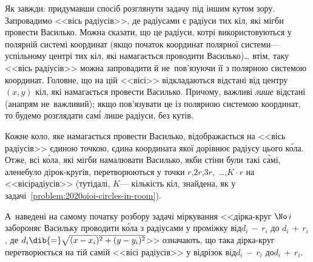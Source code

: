 Як завжди: придумавши спосіб розглянути задачу під іншим кутом зору.
Запровадимо <<вісь радіусів>>, де радіусами є радіуси тих кіл, які міг\nolinebreak[3] би провести Василько. Можна сказати, що це радіуси, котрі використовуються у полярній системі координат (якщо початок координат полярної системи\nolinebreak[3] --- у\nolinebreak[3] спільному центрі тих кіл, які намагається проводити Василько)\dots{} втім, таку <<вісь радіусів>> можна запровадити й не~пов'язуючи її з полярною системою координат. Головне, що на цій <<вісі>> відкладаються відстані від центру\nolinebreak[2] $(x,y)$ кіл, які намагається провести Василько. Причому, важливі \emph{лише} відстані (а\nolinebreak[3] напрям не~важливий); якщо пов'язу\-вати це із полярною системою координат, то будемо розглядати сам\'{і} лише радіуси, без кутів.

Кожне коло, яке намагається провести Василько, відображається на <<вісь радіусів>> єдиною точкою, єдина координата якої дорівнює радіусу %
цього к\'{о}ла. Отже, всі к\'{о}ла, які міг\nolinebreak[3] би намалювати Василько, якби стіни були такі с\'{а}мі, але\nolinebreak[3] не\nolinebreak[3] було дірок-кругів, перетворюються у точки $r$,\nolinebreak[2] $2r$,\nolinebreak[2] $3r$,~\dots{},\nolinebreak[3] $K\cdot r$ на <<вісі\nolinebreak[2] радіусів>> (тут\nolinebreak[2] і\nolinebreak[2] далі, $K$\nolinebreak[3] --- кількість кіл, знайдена, як у задачі~\ref{problem:2020oioi-circles-in-room}).

А~наведені на самому початку розбору задачі міркування <<дірка-круг $\No\,i$ забороняє Васильку проводити к\'{о}ла з радіусами у проміжку від\nolinebreak[2] ${d_i\,{-}\,r_i}$ до ${d_i\,{+}\,r_i}$, де $d_i\dib{{=}}\sqrt{(x-x_i)^2+(y-y_i)^2}$>> означають, що така дірка-круг перетворюється на тій самій <<вісі радіусів>> у відрізок від\nolinebreak[2] ${d_i\,{-}\,r_i}$ до\nolinebreak[3] ${d_i\,{+}\,r_i}$.


